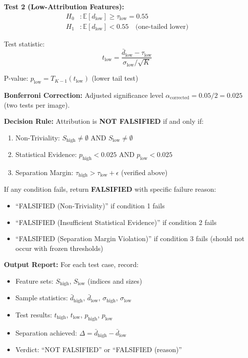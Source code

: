 \textbf{Test 2 (Low-Attribution Features):}
\begin{align}
H_0&: \mathbb{E}[d_{\text{low}}] \geq \tau_{\text{low}} = 0.55 \\
H_1&: \mathbb{E}[d_{\text{low}}] < 0.55 \quad \text{(one-tailed lower)}
\end{align}

Test statistic:
\begin{equation}
t_{\text{low}} = \frac{\bar{d}_{\text{low}} - \tau_{\text{low}}}{\sigma_{\text{low}} / \sqrt{K}}
\end{equation}

P-value: $p_{\text{low}} = T_{K-1}(t_{\text{low}})$ (lower tail test)

\textbf{Bonferroni Correction:} Adjusted significance level $\alpha_{\text{corrected}} = 0.05 / 2 = 0.025$ (two tests per image).

\textbf{Decision Rule:} Attribution is \textbf{NOT FALSIFIED} if and only if:
\begin{enumerate}
\item Non-Triviality: $S_{\text{high}} \neq \emptyset$ AND $S_{\text{low}} \neq \emptyset$
\item Statistical Evidence: $p_{\text{high}} < 0.025$ AND $p_{\text{low}} < 0.025$
\item Separation Margin: $\tau_{\text{high}} > \tau_{\text{low}} + \epsilon$ (verified above)
\end{enumerate}

If any condition fails, return \textbf{FALSIFIED} with specific failure reason:
\begin{itemize}
\item ``FALSIFIED (Non-Triviality)'' if condition 1 fails
\item ``FALSIFIED (Insufficient Statistical Evidence)'' if condition 2 fails
\item ``FALSIFIED (Separation Margin Violation)'' if condition 3 fails (should not occur with frozen thresholds)
\end{itemize}

\textbf{Output Report:} For each test case, record:
\begin{itemize}
\item Feature sets: $S_{\text{high}}$, $S_{\text{low}}$ (indices and sizes)
\item Sample statistics: $\bar{d}_{\text{high}}$, $\bar{d}_{\text{low}}$, $\sigma_{\text{high}}$, $\sigma_{\text{low}}$
\item Test results: $t_{\text{high}}$, $t_{\text{low}}$, $p_{\text{high}}$, $p_{\text{low}}$
\item Separation achieved: $\Delta = \bar{d}_{\text{high}} - \bar{d}_{\text{low}}$
\item Verdict: ``NOT FALSIFIED'' or ``FALSIFIED (reason)''
\end{itemize}

